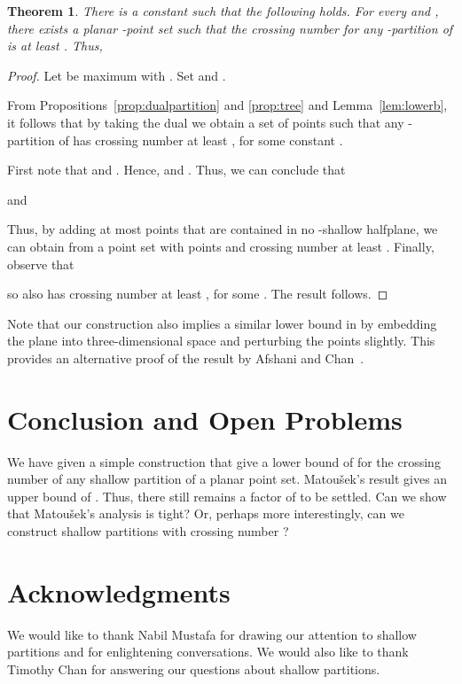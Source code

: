 \documentclass{paper}
\newcommand\matousek{{Matou{\v{s}}ek}}
\newtheorem {theorem} {Theorem}[section]
\begin{document}
\begin{theorem}
There is a constant  such that the following holds. For every 
and , there 
exists a planar -point set 
such that the crossing number for any -partition of  is at least
. Thus,

\end{theorem}

\begin{proof}
Let  be maximum with . 
Set  and . 

From Propositions~\ref{prop:dualpartition} and \ref{prop:tree} 
and Lemma~\ref{lem:lowerb}, it follows that by taking the dual
we obtain a set  of 
 points such that
any -partition of  has crossing number at least
, for some constant .

First note that  and .
Hence,  and . Thus, we can conclude that

and

Thus, by adding at most  points that are contained in no -shallow
halfplane, we can obtain from  a point set  with  points
and crossing number at least .
Finally, observe that 

so  also has crossing number at least
, for some . 
The result follows.
\end{proof}

Note that our construction also implies a similar lower bound in 
by embedding the plane into three-dimensional space and perturbing
the points slightly. This provides an alternative proof of the result
by Afshani and Chan~\cite{AfshaniCh09}.

\section{Conclusion and Open Problems}

We have given a simple construction that give a lower bound
of  for
the crossing number of
any shallow partition of a planar point set. \matousek's 
result gives an upper bound of . Thus, there still
remains a factor of  to be settled. Can we show that
\matousek's analysis is tight? Or, perhaps more interestingly, can
we construct shallow partitions with crossing number
?

\section*{Acknowledgments}

{\small
We would like to thank Nabil Mustafa for 
drawing our attention to shallow partitions
and for enlightening conversations.
We would also like to thank Timothy Chan
for answering our questions about shallow
partitions.}




\end{document}
